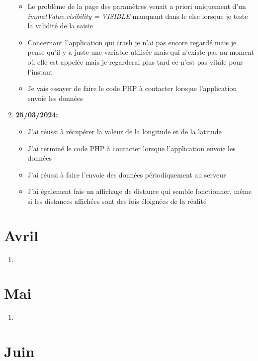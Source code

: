 \documentclass[10pt,a4paper]{book}
\begin{document}
\begin{enumerate}
\begin{itemize}
            \item Le problème de la page des paramètres venait a priori uniquement d'un \textit{immatValue.visibility = VISIBLE} manquant dans le else lorsque je teste la validité de la saisie
            \item Concernant l'application qui crash je n'ai pas encore regardé mais je pense qu'il y a juste une variable utilisée mais qui n'existe pas au moment où elle est appelée mais je regarderai plus tard ce n'est pas vitale pour l'instant
            \item Je vais essayer de faire le code PHP à contacter lorsque l'application envoie les données
        \end{itemize}
    \item \textbf{25/03/2024:}
        \begin{itemize}
            \item J'ai réussi à récupérer la valeur de la longitude et de la latitude
            \item J'ai terminé le code PHP à contacter lorsque l'application envoie les données
            \item J'ai réussi à faire l'envoie des données périodiquement au serveur
            \item J'ai également fais un affichage de distance qui semble fonctionner, même si les distances affichées sont des fois éloignées de la réalité
        \end{itemize}
\end{enumerate}

\chapter{Avril}

\begin{enumerate}
    \item 
\end{enumerate}

\chapter{Mai}

\begin{enumerate}
    \item 
\end{enumerate}

\chapter{Juin}
\end{document}
